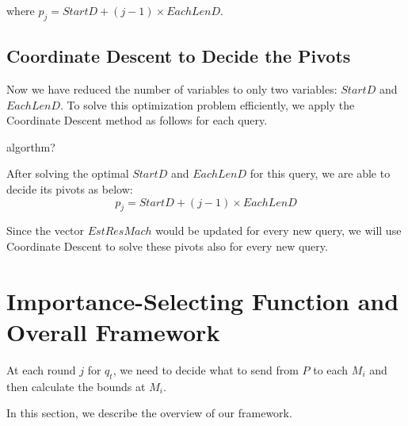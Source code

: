 where $p_j=StartD + (j-1)\times EachLenD$.


\subsection{Coordinate Descent to Decide the Pivots} %
\label{ss:coordinate_descent_to_decide_the_pivots}

Now we have reduced the number of variables to only two variables: $StartD$ and $EachLenD$. To solve this optimization problem efficiently, we apply the Coordinate Descent method as follows for each query.

algorthm?

After solving the optimal $StartD$ and $EachLenD$ for this query, we are able to decide its pivots as below:
\begin{equation}
	p_j = StartD + (j-1)\times EachLenD	
\end{equation}

Since the vector $EstResMach$ would be updated for every new query, we will use Coordinate Descent to solve these pivots also for every new query.



\section{Importance-Selecting Function and Overall Framework} %
\label{s:importance_selecting_function_and_overall_framework}
At each round $j$ for $q_t$, we need to decide what to send from $P$ to each $M_i$ and then calculate the bounds at $M_i$. 

In this section, we describe the overview of our framework.




%
